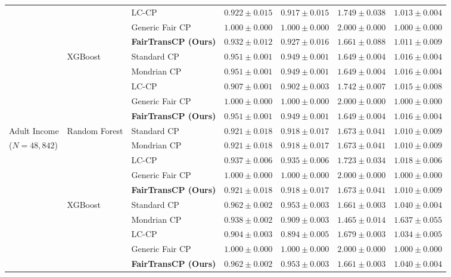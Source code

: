 \documentclass[conference]{IEEEtran}
\begin{document}
\begin{table}[t]
\begin{tabular}{lllcccc}
& & LC-CP & $0.922 \pm 0.015$ & $0.917 \pm 0.015$ & $1.749 \pm 0.038$ & $1.013 \pm 0.004$ \\
& & Generic Fair CP & $1.000 \pm 0.000$ & $1.000 \pm 0.000$ & $2.000 \pm 0.000$ & $\mathbf{1.000 \pm 0.000}$ \\
& & \textbf{FairTransCP (Ours)} & $\mathbf{0.932 \pm 0.012}$ & $\mathbf{0.927 \pm 0.016}$ & $\mathbf{1.661 \pm 0.088}$ & $\mathbf{1.011 \pm 0.009}$ \\
\cmidrule{2-7}
& XGBoost & Standard CP & $0.951 \pm 0.001$ & $0.949 \pm 0.001$ & $1.649 \pm 0.004$ & $1.016 \pm 0.004$ \\
& & Mondrian CP & $0.951 \pm 0.001$ & $0.949 \pm 0.001$ & $1.649 \pm 0.004$ & $1.016 \pm 0.004$ \\
& & LC-CP & $0.907 \pm 0.001$ & $0.902 \pm 0.003$ & $1.742 \pm 0.007$ & $1.015 \pm 0.008$ \\
& & Generic Fair CP & $1.000 \pm 0.000$ & $1.000 \pm 0.000$ & $2.000 \pm 0.000$ & $\mathbf{1.000 \pm 0.000}$ \\
& & \textbf{FairTransCP (Ours)} & $\mathbf{0.951 \pm 0.001}$ & $\mathbf{0.949 \pm 0.001}$ & $\mathbf{1.649 \pm 0.004}$ & $\mathbf{1.016 \pm 0.004}$ \\
\midrule
Adult Income & Random Forest & Standard CP & $0.921 \pm 0.018$ & $0.918 \pm 0.017$ & $1.673 \pm 0.041$ & $1.010 \pm 0.009$ \\
($N=48{,}842$) & & Mondrian CP & $0.921 \pm 0.018$ & $0.918 \pm 0.017$ & $1.673 \pm 0.041$ & $1.010 \pm 0.009$ \\
& & LC-CP & $0.937 \pm 0.006$ & $0.935 \pm 0.006$ & $1.723 \pm 0.034$ & $1.018 \pm 0.006$ \\
& & Generic Fair CP & $1.000 \pm 0.000$ & $1.000 \pm 0.000$ & $2.000 \pm 0.000$ & $\mathbf{1.000 \pm 0.000}$ \\
& & \textbf{FairTransCP (Ours)} & $\mathbf{0.921 \pm 0.018}$ & $\mathbf{0.918 \pm 0.017}$ & $\mathbf{1.673 \pm 0.041}$ & $\mathbf{1.010 \pm 0.009}$ \\
\cmidrule{2-7}
& XGBoost & Standard CP & $0.962 \pm 0.002$ & $0.953 \pm 0.003$ & $1.661 \pm 0.003$ & $1.040 \pm 0.004$ \\
& & Mondrian CP & $0.938 \pm 0.002$ & $0.909 \pm 0.003$ & $1.465 \pm 0.014$ & $1.637 \pm 0.055$ \\
& & LC-CP & $0.904 \pm 0.003$ & $0.894 \pm 0.005$ & $1.679 \pm 0.003$ & $1.034 \pm 0.005$ \\
& & Generic Fair CP & $1.000 \pm 0.000$ & $1.000 \pm 0.000$ & $2.000 \pm 0.000$ & $\mathbf{1.000 \pm 0.000}$ \\
& & \textbf{FairTransCP (Ours)} & $\mathbf{0.962 \pm 0.002}$ & $\mathbf{0.953 \pm 0.003}$ & $\mathbf{1.661 \pm 0.003}$ & $\mathbf{1.040 \pm 0.004}$ \\
\bottomrule
\end{tabular}
\end{table}
\end{document}
